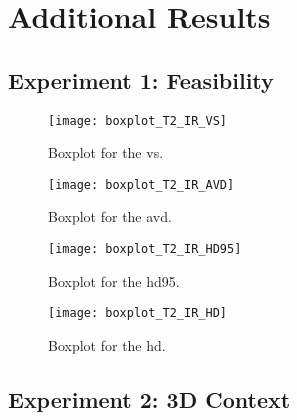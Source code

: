 \chapter{Additional Results} \label{app:results}

\section{Experiment 1: Feasibility} %

\begin{figure}[htbp]
	\centering
	\texttt{[image: boxplot\_T2\_IR\_VS]}
    \caption[Boxplot for the \acrlong{vs} for Feasibility]{Boxplot for the \acrlong{vs}.}
    \label{fig:results_boxplot_T2_IR_vs}
\end{figure}
\begin{figure}[htbp]
	\centering
	\texttt{[image: boxplot\_T2\_IR\_AVD]}
    \caption[Boxplot for the \acrlong{avd} for Feasibility]{Boxplot for the \acrlong{avd}.}
    \label{fig:results_boxplot_T2_IR_avd}
\end{figure}
\begin{figure}[htbp]
	\centering
	\texttt{[image: boxplot\_T2\_IR\_HD95]}
    \caption[Boxplot for the \acrlong{hd95} for Feasibility]{Boxplot for the \acrlong{hd95}.}
    \label{fig:results_boxplot_T2_IR_hd95}
\end{figure}
\begin{figure}[htbp]
	\centering
	\texttt{[image: boxplot\_T2\_IR\_HD]}
    \caption[Boxplot for the \acrlong{hd} for Feasibility]{Boxplot for the \acrlong{hd}.}
    \label{fig:results_boxplot_T2_IR_hd}
\end{figure}

\section{Experiment 2: 3D Context} %

